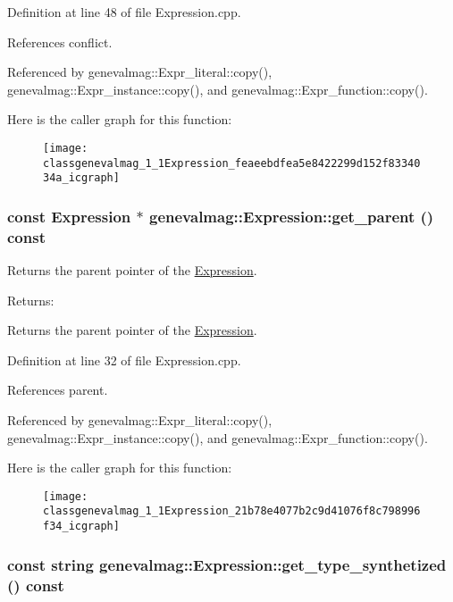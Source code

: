Definition at line 48 of file Expression.cpp.

References conflict.

Referenced by genevalmag::Expr\_\-literal::copy(), genevalmag::Expr\_\-instance::copy(), and genevalmag::Expr\_\-function::copy().

Here is the caller graph for this function:\nopagebreak
\begin{figure}[H]
\begin{center}
\leavevmode
\texttt{[image: classgenevalmag\_1\_1Expression\_feaeebdfea5e8422299d152f8334034a\_icgraph]}
\end{center}
\end{figure}
\hypertarget{classgenevalmag_1_1Expression_21b78e4077b2c9d41076f8c798996f34}{
\subsubsection[{get\_\-parent}]{\setlength{\rightskip}{0pt plus 5cm}const {\bf Expression} $\ast$ genevalmag::Expression::get\_\-parent () const}}
\label{classgenevalmag_1_1Expression_21b78e4077b2c9d41076f8c798996f34}


Returns the parent pointer of the \hyperlink{classgenevalmag_1_1Expression}{Expression}. \begin{Desc}
\item[Returns:]\end{Desc}
Returns the parent pointer of the \hyperlink{classgenevalmag_1_1Expression}{Expression}. 

Definition at line 32 of file Expression.cpp.

References parent.

Referenced by genevalmag::Expr\_\-literal::copy(), genevalmag::Expr\_\-instance::copy(), and genevalmag::Expr\_\-function::copy().

Here is the caller graph for this function:\nopagebreak
\begin{figure}[H]
\begin{center}
\leavevmode
\texttt{[image: classgenevalmag\_1\_1Expression\_21b78e4077b2c9d41076f8c798996f34\_icgraph]}
\end{center}
\end{figure}
\hypertarget{classgenevalmag_1_1Expression_70ea402fd43f8c588c83196bc4a10183}{
\subsubsection[{get\_\-type\_\-synthetized}]{\setlength{\rightskip}{0pt plus 5cm}const string genevalmag::Expression::get\_\-type\_\-synthetized () const}}
\label{classgenevalmag_1_1Expression_70ea402fd43f8c588c83196bc4a10183}


